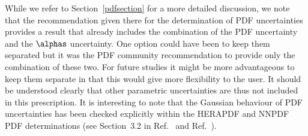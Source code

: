 While we refer to Section~\ref{pdfsection} for a more detailed
discussion, we note that the recommendation given there for the
determination of PDF uncertainties provides a result that already
includes the combination of the 
PDF uncertainty and the $\alphas$ uncertainty.
One option could have been to keep them separated but it was the PDF community 
recommendation to provide only the combination of these two. For
future studies it might be more advantageous to keep them separate in
that this would give more flexibility to the user.
It should
be understood clearly  that other parametric uncertainties are thus 
not included in this prescription.
It is interesting to note that the Gaussian behaviour of PDF
uncertainties has been checked explicitly within the HERAPDF
and NNPDF PDF determinations (see Section~3.2 in Ref.~\cite{Dittmar} and
Ref.~\cite{Ball:2010de}). 
